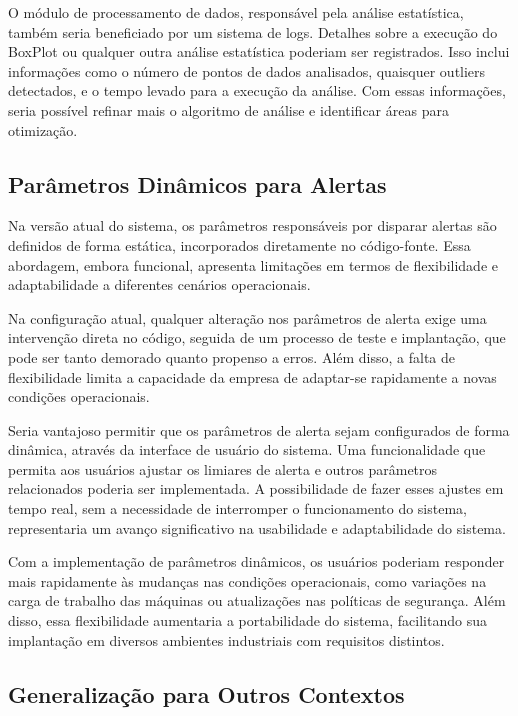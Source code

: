O módulo de processamento de dados, responsável pela análise estatística, também seria beneficiado por um sistema de logs. Detalhes sobre a execução do BoxPlot ou qualquer outra análise estatística poderiam ser registrados. Isso inclui informações como o número de pontos de dados analisados, quaisquer outliers detectados, e o tempo levado para a execução da análise. Com essas informações, seria possível refinar mais o algoritmo de análise e identificar áreas para otimização.

\subsection{Parâmetros Dinâmicos para Alertas}

Na versão atual do sistema, os parâmetros responsáveis por disparar alertas são definidos de forma estática, incorporados diretamente no código-fonte. Essa abordagem, embora funcional, apresenta limitações em termos de flexibilidade e adaptabilidade a diferentes cenários operacionais.

Na configuração atual, qualquer alteração nos parâmetros de alerta exige uma intervenção direta no código, seguida de um processo de teste e implantação, que pode ser tanto demorado quanto propenso a erros. Além disso, a falta de flexibilidade limita a capacidade da empresa de adaptar-se rapidamente a novas condições operacionais.

Seria vantajoso permitir que os parâmetros de alerta sejam configurados de forma dinâmica, através da interface de usuário do sistema. Uma funcionalidade que permita aos usuários ajustar os limiares de alerta e outros parâmetros relacionados poderia ser implementada. A possibilidade de fazer esses ajustes em tempo real, sem a necessidade de interromper o funcionamento do sistema, representaria um avanço significativo na usabilidade e adaptabilidade do sistema.

Com a implementação de parâmetros dinâmicos, os usuários poderiam responder mais rapidamente às mudanças nas condições operacionais, como variações na carga de trabalho das máquinas ou atualizações nas políticas de segurança. Além disso, essa flexibilidade aumentaria a portabilidade do sistema, facilitando sua implantação em diversos ambientes industriais com requisitos distintos.

\subsection{Generalização para Outros Contextos}

